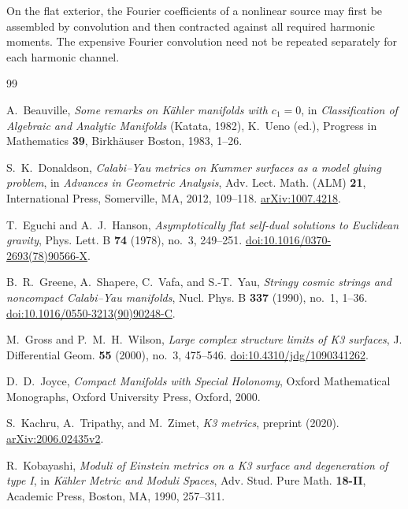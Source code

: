 \documentclass[11pt,a4paper,twoside]{article}
\numberwithin{equation}{section}
\theoremstyle{definition}
\theoremstyle{remark}
\begin{document}
On the flat exterior, the Fourier coefficients of a nonlinear source
may first be assembled by convolution and then contracted against all
required harmonic moments.  The expensive Fourier convolution need
not be repeated separately for each harmonic channel.


\clearpage
\begin{thebibliography}{99}

A.~Beauville,
\emph{Some remarks on K\"ahler manifolds with \(c_1=0\)},
in \emph{Classification of Algebraic and Analytic Manifolds}
(Katata, 1982), K.~Ueno (ed.),
Progress in Mathematics \textbf{39}, Birkh\"auser Boston,
1983, 1--26.


S.~K.~Donaldson,
\emph{Calabi--Yau metrics on Kummer surfaces as a model gluing problem},
in \emph{Advances in Geometric Analysis},
Adv. Lect. Math. (ALM) \textbf{21}, International Press,
Somerville, MA, 2012, 109--118.
\href{https://arxiv.org/abs/1007.4218}{arXiv:1007.4218}.


T.~Eguchi and A.~J.~Hanson,
\emph{Asymptotically flat self-dual solutions to Euclidean gravity},
Phys. Lett. B \textbf{74} (1978), no.~3, 249--251.
\href{https://doi.org/10.1016/0370-2693(78)90566-X}{doi:10.1016/0370-2693(78)90566-X}.

B.~R.~Greene, A.~Shapere, C.~Vafa, and S.-T.~Yau,
\emph{Stringy cosmic strings and noncompact Calabi--Yau manifolds},
Nucl. Phys. B \textbf{337} (1990), no.~1, 1--36.
\href{https://doi.org/10.1016/0550-3213(90)90248-C}{doi:10.1016/0550-3213(90)90248-C}.


M.~Gross and P.~M.~H.~Wilson,
\emph{Large complex structure limits of K3 surfaces},
J. Differential Geom. \textbf{55} (2000), no.~3, 475--546.
\href{https://doi.org/10.4310/jdg/1090341262}{doi:10.4310/jdg/1090341262}.

D.~D.~Joyce,
\emph{Compact Manifolds with Special Holonomy},
Oxford Mathematical Monographs, Oxford University Press, Oxford, 2000.

S.~Kachru, A.~Tripathy, and M.~Zimet,
\emph{K3 metrics}, preprint (2020).
\href{https://arxiv.org/abs/2006.02435v2}{arXiv:2006.02435v2}.


R.~Kobayashi,
\emph{Moduli of Einstein metrics on a K3 surface and degeneration of type I},
in \emph{K\"ahler Metric and Moduli Spaces},
Adv. Stud. Pure Math. \textbf{18-II}, Academic Press, Boston, MA,
1990, 257--311.


\end{thebibliography}
\end{document}
